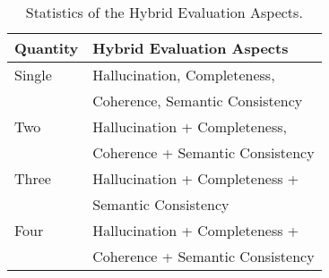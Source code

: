 \begin{table}[t]
\centering
\small
\begin{tabular}{l|l}
\hline
\textbf{Quantity} & \textbf{Hybrid Evaluation Aspects}  \\
\hline
Single & Hallucination, Completeness, \\  
& Coherence, Semantic Consistency \\ \hline
Two & Hallucination + Completeness, \\  
& Coherence + Semantic Consistency \\ \hline

Three & Hallucination + Completeness + \\  
& Semantic Consistency \\ \hline
Four & Hallucination + Completeness +\\  
& Coherence + Semantic Consistency \\ 
\hline
\end{tabular}
\caption{Statistics of the Hybrid Evaluation Aspects.}
\label{table1:hyb_dimensions}  %
\end{table}


